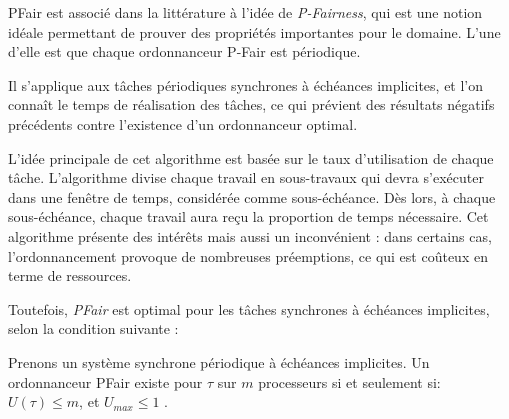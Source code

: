 	PFair est associé dans la littérature à l'idée de \textit{P-Fairness}, qui est une notion 
	idéale permettant de prouver des propriétés importantes pour le domaine. 
	L'une d'elle est que chaque ordonnanceur P-Fair est périodique. \newline
	
	Il s'applique aux tâches périodiques synchrones à échéances implicites, 
	et l'on connaît le temps de réalisation des tâches, 
	ce qui prévient des résultats négatifs précédents contre 
	l'existence d'un ordonnanceur optimal.\newline
	
	L'idée principale de cet algorithme est basée sur le taux d'utilisation de chaque tâche. 
	L'algorithme divise chaque travail en sous-travaux qui devra s'exécuter dans une fenêtre de temps, 
	considérée comme sous-échéance. Dès lors, à chaque sous-échéance, 
	chaque travail aura reçu la proportion de temps nécessaire. 
	Cet algorithme présente des intérêts mais aussi un inconvénient : dans certains cas, 
	l'ordonnancement provoque de nombreuses préemptions, ce qui est coûteux en terme de ressources.\newline
	
	Toutefois, \textit{PFair} est optimal pour les tâches synchrones à échéances implicites, selon 
	la condition suivante :\medskip
	\begin{mydef}
		Prenons un système synchrone périodique à échéances implicites. 
		Un ordonnanceur PFair existe pour $\tau$ sur $m$ processeurs si et seulement si:\medskip
		$U(\tau) \leq m$, et $U_{max} \leq 1$ \cite{baruah_proportionate_1996}.
	\end{mydef}
	
